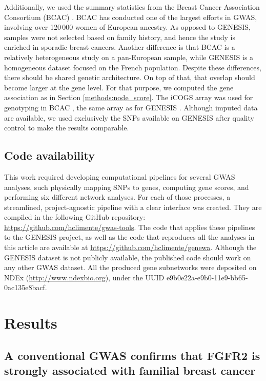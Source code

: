\documentclass[twocolumn, 10pt]{article}
\begin{document}
Additionally, we used the summary statistics from the Breast Cancer Association Consortium (BCAC) \cite{michailidou_genome-wide_2015}. BCAC has conducted one of the largest efforts in GWAS, involving over 120\,000 women of European ancestry. As opposed to GENESIS, samples were not selected based on family history, and hence the study is enriched in sporadic breast cancers. Another difference is that BCAC is a relatively heterogeneous study on a pan-European sample, while GENESIS is a homogeneous dataset focused on the French population. Despite these differences, there should be shared genetic architecture. On top of that, that overlap should become larger at the gene level. For that purpose, we computed the gene association as in Section \ref{methods:node_score}. The iCOGS array was used for genotyping in BCAC \cite{sakoda_turning_2013}, the same array as for GENESIS \cite{sinilnikova_genesis:_2016}. Although imputed data are available, we used exclusively the SNPs available on GENESIS after quality control to make the results comparable.

\subsection{Code availability}

This work required developing computational pipelines for several GWAS analyses, such physically mapping SNPs to genes, computing gene scores, and performing six different network analyses. For each of those processes, a streamlined, project-agnostic pipeline with a clear interface was created. They are compiled in the following GitHub repository: \url{https://github.com/hclimente/gwas-tools}. The code that applies these pipelines to the GENESIS project, as well as the code that reproduces all the analyses in this article are available at \url{https://github.com/hclimente/genewa}. Although the GENESIS dataset is not publicly available, the published code should work on any other GWAS dataset. All the produced gene subnetworks were deposited on NDEx (\url{http://www.ndexbio.org}), under the UUID e9b0e22a-e9b0-11e9-bb65-0ac135e8bacf.

\section{Results}

\subsection{A conventional GWAS confirms that FGFR2 is strongly associated with familial breast cancer}
\label{results:conventional}
\end{document}
